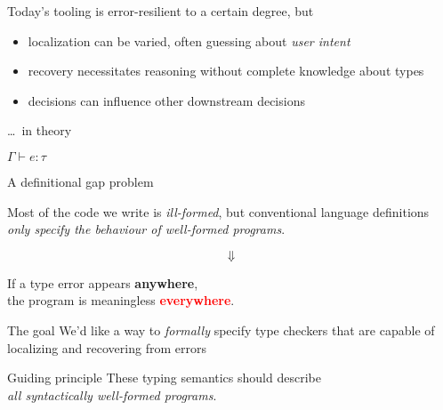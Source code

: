 \begin{frame}
  Today's tooling is error-resilient to a certain degree\pause, but

  \vspace{1em}
  \pause
  \begin{itemize}
    \item localization can be varied\pause, often guessing about \emph{user intent}

      \pause
    \item recovery necessitates reasoning without complete knowledge about types

      \pause
    \item decisions can influence other downstream decisions
  \end{itemize}
\end{frame}

\begin{frame}{\ldots\ in theory}
  \begin{center}
    \Large
    $\Gamma \vdash e : \tau$
  \end{center}
\end{frame}

\begin{frame}{A definitional gap problem}
  \begin{center}
    Most of the code we write is \emph{ill-formed}\pause,
    but conventional language definitions
    \emph{only specify the behaviour of well-formed programs}.
  \end{center}
  \pause
  \[%
    \bm{\Downarrow}
  \]%

  \begin{center}
    If a type error appears \textcolor{RedOrange}{\textbf{anywhere}},\\
    the program is meaningless \textcolor{Red}{\textbf{everywhere}}.
  \end{center}
\end{frame}

\begin{frame}{The goal}
  We'd like a way to \emph{formally} specify type checkers that are capable of localizing and
  recovering from errors

  \vspace{1em}
  \pause
  \begin{emphbox}{Guiding principle}
    \pause
    These typing semantics should describe \\
    \emph{all syntactically well-formed programs}.
  \end{emphbox}
\end{frame}

